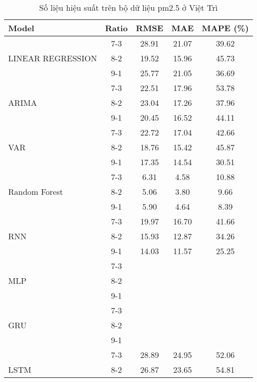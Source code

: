 \begin{table}[h!]
    \centering
    \caption{Số liệu hiệu suất trên bộ dữ liệu pm2.5 ở Việt Trì}
    \begin{tabular}{|l|c|c|c|c|}
    \hline
    \rowcolor{orange!30} \textbf{Model} & \textbf{Ratio} & \textbf{RMSE} & \textbf{MAE} & \textbf{MAPE (\%)} \\ \hline
    \rowcolor{white}  & 7-3 & 28.91 & 21.07 & 39.62 \\ 
    \rowcolor{white}  LINEAR REGRESSION & 8-2 & 19.52 & 15.96 & 45.73 \\ 
    \rowcolor{white}  & 9-1 & 25.77 & 21.05 & 36.69 \\ \hline
    \rowcolor{white}  & 7-3 & 22.51 & 17.96 & 53.78 \\ 
    \rowcolor{white} ARIMA & 8-2 & 23.04 & 17.26 & 37.96 \\
    \rowcolor{white}  & 9-1 & 20.45 & 16.52 & 44.11 \\ \hline
    \rowcolor{white}  & 7-3 & 22.72 & 17.04 & 42.66 \\ 
    \rowcolor{white} VAR & 8-2 & 18.76 & 15.42 & 45.87 \\ 
    \rowcolor{white}  & 9-1 & 17.35 & 14.54 & 30.51 \\ \hline
    \rowcolor{white} & 7-3 & 6.31 & 4.58 & 10.88 \\ 
    \rowcolor{white} Random Forest & 8-2 & 5.06 & 3.80 & 9.66 \\ 
    \rowcolor{white} & 9-1 & 5.90 & 4.64 & 8.39 \\ \hline
    \rowcolor{white}  & 7-3 & 19.97 & 16.70 & 41.66 \\ 
    \rowcolor{white} RNN & 8-2 & 15.93 & 12.87 & 34.26 \\ 
    \rowcolor{white}  & 9-1 & 14.03 & 11.57 & 25.25 \\ \hline
    \rowcolor{white} & 7-3 &  &  &  \\ 
    \rowcolor{white} MLP & 8-2 &  &  &  \\ 
    \rowcolor{white} & 9-1 &  &  &  \\ \hline
    \rowcolor{white} & 7-3 &  &  &  \\ 
    \rowcolor{white} GRU & 8-2 &  &  &  \\ 
    \rowcolor{white} & 9-1 &  &  &  \\ \hline
    \rowcolor{white}  & 7-3 & 28.89 & 24.95 & 52.06 \\ 
    \rowcolor{white} LSTM & 8-2 & 26.87 & 23.65 & 54.81 \\ 

\end{tabular}
\end{table}
